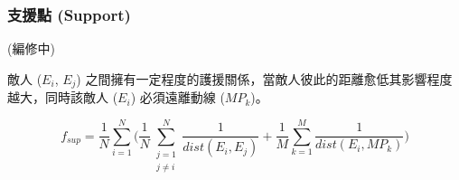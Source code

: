 \subsubsection{支援點 (Support)}
\label{sssec:method-segments-fitnesses-support}

(編修中)

敵人 ($E_{i}$, $E_{j}$) 之間擁有一定程度的護援關係，當敵人彼此的距離愈低其影響程度越大，同時該敵人 ($E_{i}$) 必須遠離動線 ($MP_{k}$)。

\begin{equation}
f_{sup}=\frac{1}{N} \sum_{i=1}^{N} \bigg( \frac{1}{N} \sum_{\substack{j=1 \\ j \neq i}}^{N} \frac{1}{dist(E_{i}, E_{j})} + \frac{1}{M} \sum_{k=1}^{M} \frac{1}{dist(E_{i}, MP_{k})} \bigg)
\end{equation}










